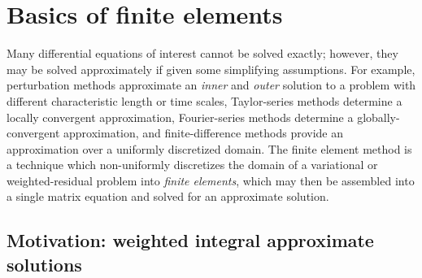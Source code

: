 
\chapter{Basics of finite elements}

Many differential equations of interest cannot be solved exactly; however, they may be solved approximately if given some simplifying assumptions.  For example, perturbation methods approximate an \emph{inner} and \emph{outer} solution to a problem with different characteristic length or time scales, Taylor-series methods determine a locally convergent approximation, Fourier-series methods determine a globally-convergent approximation, and finite-difference methods provide an approximation over a uniformly discretized domain.  The finite element method is a technique which non-uniformly discretizes the domain of a variational or weighted-residual problem into \emph{finite elements}, which may then be assembled into a single matrix equation and solved for an approximate solution.


\section{Motivation: weighted integral approximate solutions} \label{ssn_intro_motivation}

